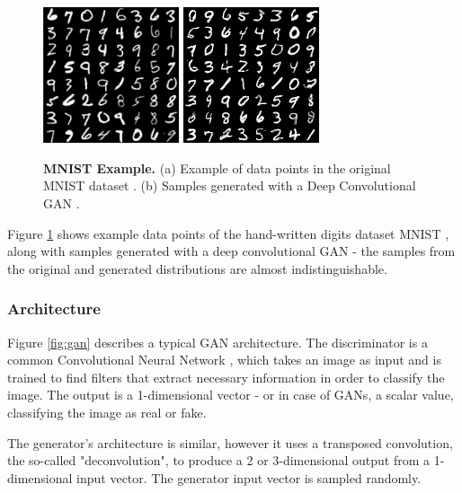 \documentclass{article}
\begin{document}
\begin{figure}[h]
\centering
{}
{\includegraphics[height=4cm]{GAN/mnist_orig}}\hspace{1cm}
{\includegraphics[height=4cm]{GAN/mnist_dcgan}}
\caption{\label{fig:mnist} \textbf{MNIST Example.}
(a) Example of data points in the original MNIST dataset \cite{lecun_mnist_nodate}. (b) Samples generated with a Deep Convolutional GAN \cite{kim_dcgan-tensorflow_2018}.}
\end{figure}

Figure \ref{fig:mnist} shows example data points of the hand-written digits dataset MNIST \cite{lecun_mnist_nodate}, along with samples generated with a deep convolutional GAN \cite{kim_dcgan-tensorflow_2018} - the samples from the original and generated distributions are almost indistinguishable.


\subsubsection{Architecture}

Figure \ref{fig:gan} describes a typical GAN architecture. The discriminator is a common Convolutional Neural Network \cite{lecun_convolutional_1995}, which takes an image as input and is trained to find filters that extract necessary information in order to classify the image. The output is a 1-dimensional vector - or in case of GANs, a scalar value, classifying the image as real or fake. 

The generator's architecture is similar, however it uses a transposed convolution, the so-called "deconvolution", to produce a 2 or 3-dimensional output from a 1-dimensional input vector. The generator input vector is sampled randomly.
\end{document}
